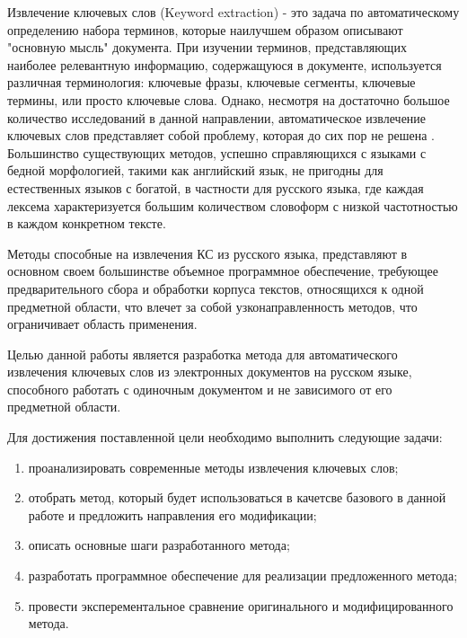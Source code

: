 Извлечение ключевых слов (Keyword extraction) - это задача по автоматическому определению набора терминов, которые наилучшем образом описывают "основную мысль" документа.
При изучении терминов, представляющих наиболее релевантную информацию, содержащуюся в документе, используется различная терминология: ключевые фразы, ключевые сегменты, ключевые термины, или просто ключевые слова.
Однако, несмотря на достаточно большое количество исследований в данной направлении, автоматическое извлечение ключевых слов представляет собой проблему, которая до сих пор не решена \cite{9}. 
Большинство существующих методов, успешно справляющихся с языками с бедной морфологией, такими как английский язык, не пригодны для естественных языков с богатой, в частности для русского языка, где каждая лексема характеризуется большим количеством словоформ с низкой частотностью в каждом конкретном тексте.

Методы способные на извлечения КС из русского языка, представляют в основном своем большинстве объемное программное обеспечение, требующее предварительного сбора и обработки корпуса текстов,  относящихся к одной предметной области, что влечет за собой узконаправленность методов, что ограничивает область применения.

Целью данной работы является разработка метода для автоматического извлечения ключевых слов из электронных документов на русском языке, способного работать с одиночным документом и не зависимого от его предметной области.

Для достижения поставленной цели необходимо выполнить следующие задачи:
\begin{enumerate}
	\item проанализировать современные методы извлечения ключевых слов;
	\item отобрать метод, который будет использоваться в качетсве базового в данной работе и предложить направления его модификации;
	\item описать основные шаги разработанного метода;
	\item разработать программное обеспечение для реализации предложенного метода;
	\item провести эксперементальное сравнение оригинального и модифицированного метода.
\end{enumerate}